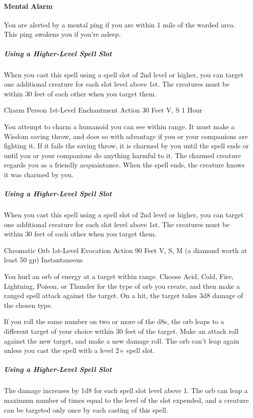 \documentclass[letterpaper,openany,oneside,twocolumn]{book}
\begin{document}
\paragraph*{Mental Alarm} You are alerted by a mental ping if you are within 1 mile of the warded area. This ping awakens you if you're asleep.

\subparagraph*{Using a Higher-Level Spell Slot} When you cast this spell using a spell slot of 2nd level or higher, you can target one additional creature for each slot level above 1st. The creatures must be within 30 feet of each other when you target them.

\DndSpellHeader
  {Charm Person}
  {1st-Level Enchantment}
  {Action}
  {30 Feet}
  {V, S}
  {1 Hour}

You attempt to charm a humanoid you can see within range. It must make a Wisdom saving throw, and does so with advantage if you or your companions are fighting it. If it fails the saving throw, it is charmed by you until the spell ends or until you or your companions do anything harmful to it. The charmed creature regards you as a friendly acquaintance. When the spell ends, the creature knows it was charmed by you.

\subparagraph*{Using a Higher-Level Spell Slot} When you cast this spell using a spell slot of 2nd level or higher, you can target one additional creature for each slot level above 1st. The creatures must be within 30 feet of each other when you target them.

\DndSpellHeader
  {Chromatic Orb}
  {1st-Level Evocation}
  {Action}
  {90 Feet}
  {V, S, M (a diamond worth at least 50 gp)}
  {Instantaneous}

You hurl an orb of energy at a target within range. Choose Acid, Cold, Fire, Lightning, Poison, or Thunder for the type of orb you create, and then make a ranged spell attack against the target. On a hit, the target takes 3d8 damage of the chosen type.

If you roll the same number on two or more of the d8s, the orb leaps to a different target of your choice within 30 feet of the target. Make an attack roll against the new target, and make a new damage roll. The orb can't leap again unless you cast the spell with a level 2+ spell slot.

\subparagraph*{Using a Higher-Level Spell Slot} The damage increases by 1d8 for each spell slot level above 1. The orb can leap a maximum number of times equal to the level of the slot expended, and a creature can be targeted only once by each casting of this spell.
\end{document}
